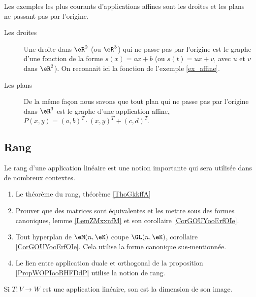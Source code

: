 \begin{example}
	Les exemples les plus courants d'applications affines sont les droites et les plans ne passant pas par l'origine.
	\begin{description}
		\item[Les droites] Une droite dans $\eR^2$ (ou $\eR^3$) qui ne passe pas par l'origine est le graphe d'une fonction de la forme $s(x)=ax+b$ (ou $s(t)=u x +v$, avec $u$ et $v$  dans $\eR^2$). On reconnait ici la fonction de l'exemple \ref{ex_affine}.
			
		\item[Les plans]
			De la même façon nous savons que tout plan qui ne passe pas par l'origine dans $\eR^3$ est le graphe d'une application affine, $P(x,y)= (a,b)^T\cdot(x,y)^T+(c,d)^T$.
	\end{description}
\end{example}

\subsection{Rang}

Le rang d'une application linéaire est une notion importante qui sera utilisée dans de nombreux contextes.
\begin{enumerate}
    \item Le théorème du rang, théorème \ref{ThoGkkffA}
    \item Prouver que des matrices sont équivalentes et les mettre sous des formes canoniques, lemme \ref{LemZMxxnfM} et son corollaire \ref{CorGOUYooErfOIe}.
    \item Tout hyperplan de \( \eM(n,\eK)\) coupe \( \GL(n,\eK)\), corollaire \ref{CorGOUYooErfOIe}. Cela utilise la forme canonique sus-mentionnée.
    \item Le lien entre application duale et orthogonal de la proposition \ref{PropWOPIooBHFDdP} utilise la notion de rang.
\end{enumerate}

\begin{definition}\label{DefALUAooSPcmyK}
    Si  $T\colon V\to W$ est une application linéaire, son  est la dimension de son image. 
\end{definition}

